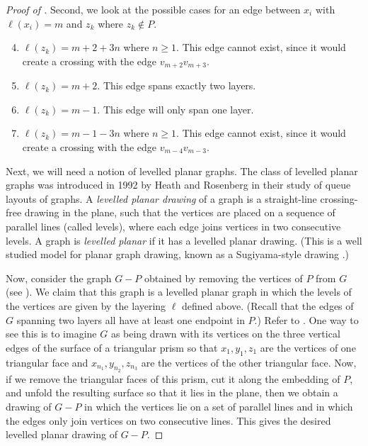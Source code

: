 \documentclass{patmorin}
\begin{document}
\begin{proof}[Proof of ]
  Second, we look at the possible cases for an edge between $x_i$ with $\ell(x_i) = m$ and $z_k$ where $z_k \notin P$.
 \begin{enumerate}
  \setcounter{enumi}{3}
  	\item $\ell(z_k) = m+2+3n$ where $n \geq 1$. This edge cannot exist, since it would create a crossing with the edge $v_{m+2}v_{m+3}$.
  	\item$\ell(z_k) =  m+2$. This edge spans exactly two layers.
  	\item$\ell(z_k) =  m-1$. This edge will only span one layer.
  	\item $\ell(z_k) =  m-1-3n$ where $n \geq 1$. This edge cannot exist, since it would create a crossing with the edge $v_{m-4}v_{m-3}$.
  \end{enumerate}


  Next, we will need a notion of levelled planar graphs. The class of levelled
  planar graphs was introduced in 1992 by Heath and Rosenberg
  \cite{HR-SJC92} in their study of queue layouts of graphs. A \emph{levelled
  planar drawing} of a graph is a straight-line crossing-free drawing in
  the plane, such that the vertices are placed on a sequence of parallel
  lines (called levels), where each edge joins vertices in two
  consecutive levels. A graph is \emph{levelled planar} if it has a levelled
  planar drawing. (This is a well studied model for planar
  graph drawing, known as a Sugiyama-style drawing \cite{STT81,BM2001,HN2013,BETT99}.)

  Now, consider the graph $G-P$ obtained by removing the vertices of $P$
  from $G$ (see ).  We claim that this graph is a levelled
  planar graph in which the levels
  of the vertices are given by the layering $\ell$ defined above. (Recall that the edges of $G$ spanning two layers all have at least one endpoint in $P$.)
  Refer to . One way to see this is to imagine $G$
  as being drawn with its vertices on the three vertical edges of the surface of
  a triangular prism so that $x_1,y_1,z_1$ are the vertices of one
  triangular face and $x_{n_1},y_{n_2},z_{n_3}$ are the vertices of
  the other triangular face.  Now, if we remove the triangular faces
  of this prism, cut it along the embedding of $P$, and unfold
  the resulting surface so that it lies in the plane, then we obtain a
  drawing of $G-P$ in which the vertices lie on a set of parallel lines
  and in which the edges only join vertices on two consecutive lines.
  This gives the desired levelled planar drawing of $G-P$.


\end{proof}
\end{document}
